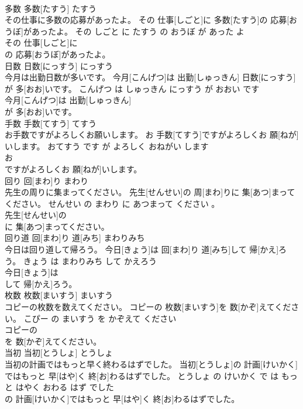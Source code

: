 \documentclass[8pt]{extreport}
\begin{document}
\begin{CJK}{UTF8}{min}
\\	多数	多数[たすう]	たすう	
\\	その仕事に多数の応募があったよ。	その 仕事[しごと]に 多数[たすう]の 応募[おうぼ]があったよ。	その しごと に たすう の おうぼ が あった よ	
\\	その 仕事[しごと]に
\\	の 応募[おうぼ]があったよ。			
\\	日数	日数[にっすう]	にっすう	
\\	今月は出勤日数が多いです。	今月[こんげつ]は 出勤[しゅっきん] 日数[にっすう]が 多[おお]いです。	こんげつ は しゅっきん にっすう が おおい です	
\\	今月[こんげつ]は 出勤[しゅっきん]
\\	が 多[おお]いです。			
\\	手数	手数[てすう]	てすう	
\\	お手数ですがよろしくお願いします。	お 手数[てすう]ですがよろしくお 願[ねが]いします。	おてすう です が よろしく おねがい します	
\\	お
\\	ですがよろしくお 願[ねが]いします。			
\\	回り	回[まわ]り	まわり	
\\	先生の周りに集まってください。	先生[せんせい]の 周[まわ]りに 集[あつ]まってください。	せんせい の まわり に あつまって ください 。	
\\	先生[せんせい]の
\\	に 集[あつ]まってください。			
\\	回り道	回[まわ]り 道[みち]	まわりみち	
\\	今日は回り道して帰ろう。	今日[きょう]は 回[まわ]り 道[みち]して 帰[かえ]ろう。	きょう は まわりみち して かえろう	
\\	今日[きょう]は
\\	して 帰[かえ]ろう。			
\\	枚数	枚数[まいすう]	まいすう	
\\	コピーの枚数を数えてください。	コピーの 枚数[まいすう]を 数[かぞ]えてください。	こぴー の まいすう を かぞえて ください	
\\	コピーの
\\	を 数[かぞ]えてください。			
\\	当初	当初[とうしょ]	とうしょ	
\\	当初の計画ではもっと早く終わるはずでした。	当初[とうしょ]の 計画[けいかく]ではもっと 早[はや]く 終[お]わるはずでした。	とうしょ の けいかく で は もっと はやく おわる はず でした	
\\	の 計画[けいかく]ではもっと 早[はや]く 終[お]わるはずでした。			

\end{CJK}
\end{document}
